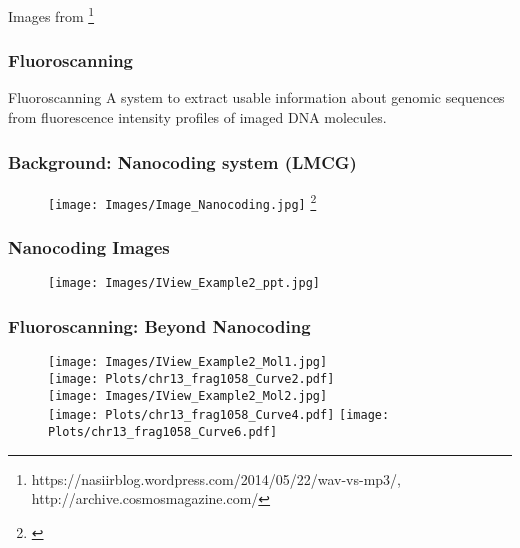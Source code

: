 \documentclass[10pt,dvipsnames,table]{beamer}
\begin{document}
\begin{frame}
\begin{columns}[t]
\begin{column}{0.5\textwidth}
\end{column}
\end{columns}
{\tiny{Images from \footnote{\tiny{https://nasiirblog.wordpress.com/2014/05/22/wav-vs-mp3/, http://archive.cosmosmagazine.com/}} }}
\end{frame}

\begin{frame}
\frametitle{Fluoroscanning}
\begin{block}{Fluoroscanning}
A system to extract usable information about genomic sequences from fluorescence intensity profiles of imaged DNA molecules. 
\end{block}
\end{frame}

\begin{frame}
\frametitle{Background: Nanocoding system (LMCG)}
\begin{figure}[T]
\texttt{[image: Images/Image\_Nanocoding.jpg]} \footnote{\tiny{\cite{Kounovsky_2013_PhDThesis}}}
\end{figure}

\note{}
\end{frame}

\begin{frame}
\frametitle{Nanocoding Images}
\begin{center}
\begin{figure}[H]
\texttt{[image: Images/IView\_Example2\_ppt.jpg]}
\end{figure}
\end{center}
\end{frame}

\begin{frame}
\frametitle{Fluoroscanning: Beyond Nanocoding}
\begin{figure}[H]
\texttt{[image: Images/IView\_Example2\_Mol1.jpg]} \\
\texttt{[image: Plots/chr13\_frag1058\_Curve2.pdf]} \\

\texttt{[image: Images/IView\_Example2\_Mol2.jpg]} \\
\texttt{[image: Plots/chr13\_frag1058\_Curve4.pdf]} 
\texttt{[image: Plots/chr13\_frag1058\_Curve6.pdf]} 
\end{figure}

\end{frame}
\end{document}
